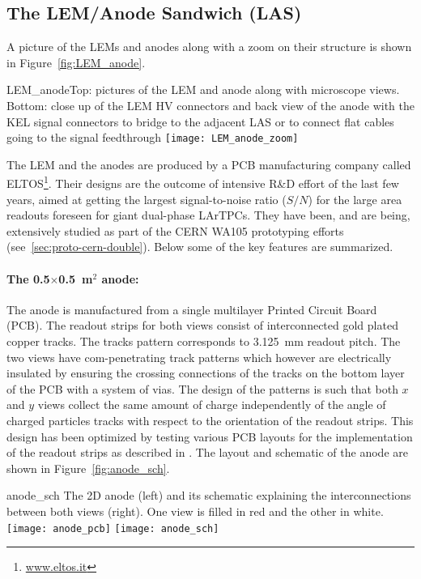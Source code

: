 \subsection{The LEM/Anode Sandwich (LAS)}

A picture of the LEMs and anodes along with a zoom on their structure
is shown in Figure~\ref{fig:LEM_anode}.
\begin{cdrfigure}
{LEM_anode}{Top: pictures of the LEM and anode along with microscope
  views. Bottom: close up of the LEM HV connectors and back view of the anode 
with the KEL signal connectors to bridge to the adjacent LAS or to connect 
flat cables going to the signal feedthrough}
 \texttt{[image: LEM\_anode\_zoom]}  
 \end{cdrfigure}

The LEM and the anodes are produced by a PCB manufacturing company
called ELTOS\footnote{\url{www.eltos.it}}. Their designs are the
outcome of intensive R\&D effort of the last few years, aimed at
getting the largest signal-to-noise ratio ($S/N$) for the large area
readouts foreseen for giant dual-phase LArTPCs. They have
been, and are being, extensively studied as part of the CERN WA105
prototyping efforts (see~\ref{sec:proto-cern-double}). Below some of
the key features are summarized.

 \paragraph{The 0.5$\times$0.5~m$^2$ anode:}
The anode is manufactured from a single multilayer Printed Circuit
Board (PCB). The readout strips for both views consist of
interconnected gold plated copper tracks. The tracks pattern
corresponds to 3.125~mm readout pitch. The two views have
com-penetrating track patterns which however are electrically
insulated by ensuring the crossing connections of the tracks on the
bottom layer of the PCB with a system of vias. The design of the
patterns is such that both $x$ and $y$ views collect the same amount
of charge independently of the angle of charged particles tracks with
respect to the orientation of the readout strips. This design has been
optimized by testing various PCB layouts for the implementation of the
readout strips as described in \cite{Cantini:2013yba}.  The layout and
schematic of the anode are shown in Figure~\ref{fig:anode_sch}.
\begin{cdrfigure}{anode_sch}
{The 2D anode (left) and its schematic explaining the  interconnections 
between both views (right). One view is filled  in red and the other in white.}
\texttt{[image: anode\_pcb]} \hspace{0.2cm} \texttt{[image: anode\_sch]}
\end{cdrfigure}

